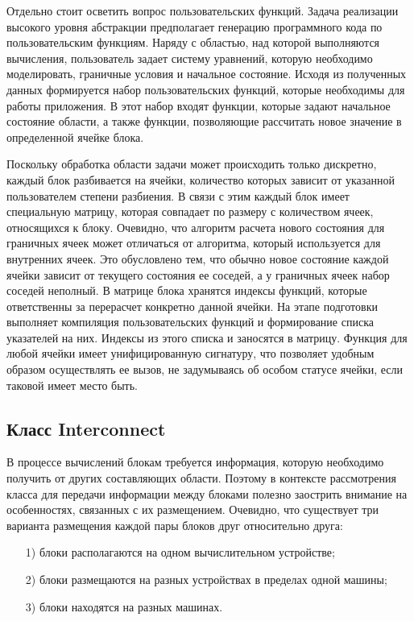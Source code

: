 \documentclass[a4paper, 14pt]{extarticle}
\theoremstyle{definition}
\begin{document}
\par Отдельно стоит осветить вопрос пользовательских функций. Задача реализации высокого уровня абстракции предполагает генерацию программного кода по пользовательским функциям. Наряду с областью, над которой выполняются вычисления, пользователь задает систему уравнений, которую необходимо моделировать, граничные условия и начальное состояние. Исходя из полученных данных формируется набор пользовательских функций, которые необходимы для работы приложения. В этот набор входят функции, которые задают начальное состояние области, а также функции, позволяющие рассчитать новое значение в определенной ячейке блока.

\par Поскольку обработка области задачи может происходить только дискретно, каждый блок разбивается на ячейки, количество которых зависит от указанной пользователем степени разбиения. В связи с этим каждый блок имеет специальную матрицу, которая совпадает по размеру с количеством ячеек, относящихся к блоку. Очевидно, что алгоритм расчета нового состояния для граничных ячеек может отличаться от алгоритма, который используется для внутренних ячеек. Это обусловлено тем, что обычно новое состояние каждой ячейки зависит от текущего состояния ее соседей, а у граничных ячеек набор соседей неполный. В матрице блока хранятся индексы функций, которые ответственны за перерасчет конкретно данной ячейки. На этапе подготовки выполняет компиляция пользовательских функций и формирование списка указателей на них. Индексы из этого списка и заносятся в матрицу. Функция для любой ячейки имеет унифицированную сигнатуру, что позволяет удобным образом осуществлять ее вызов, не задумываясь об особом статусе ячейки, если таковой имеет место быть.



\subsection{Класс Interconnect}

\par В процессе вычислений блокам требуется информация, которую необходимо получить от других составляющих области. Поэтому в контексте рассмотрения класса для передачи информации между блоками полезно заострить внимание на особенностях, связанных с их размещением. Очевидно, что существует три варианта размещения каждой пары блоков друг относительно друга:
\begin{enumerate}
\item[1)] блоки располагаются на одном вычислительном устройстве;
\item[2)] блоки размещаются на разных устройствах в пределах одной машины;
\item[3)] блоки находятся на разных машинах.
\end{enumerate}
\end{document}
